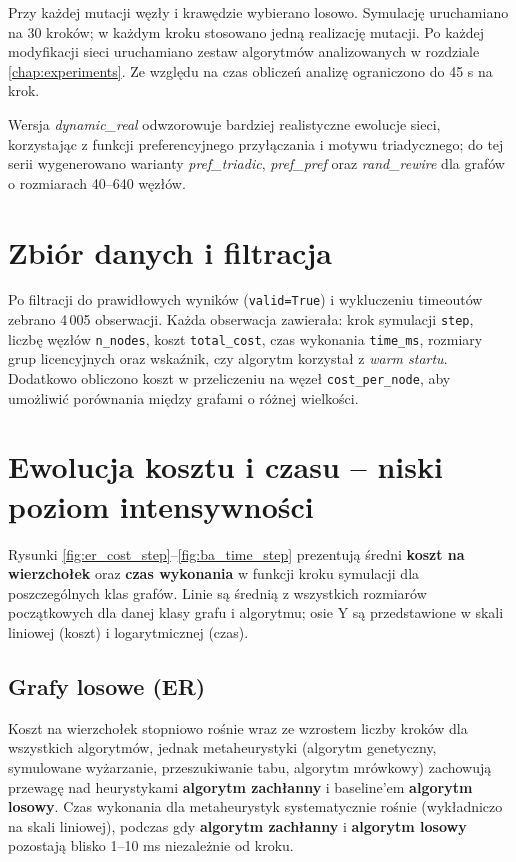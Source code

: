 Przy każdej mutacji węzły i krawędzie wybierano losowo. Symulację uruchamiano na 30 kroków; w każdym kroku stosowano jedną realizację mutacji. Po każdej modyfikacji sieci uruchamiano zestaw algorytmów analizowanych w rozdziale \ref{chap:experiments}. Ze względu na czas obliczeń analizę ograniczono do 45 s na krok.

Wersja \emph{dynamic\_real} odwzorowuje bardziej realistyczne ewolucje sieci, korzystając z funkcji preferencyjnego przyłączania i motywu triadycznego; do tej serii wygenerowano warianty \emph{pref\_triadic}, \emph{pref\_pref} oraz \emph{rand\_rewire} dla grafów o rozmiarach 40--640 węzłów.

\section{Zbiór danych i filtracja}

Po filtracji do prawidłowych wyników (\texttt{valid=True}) i wykluczeniu timeoutów zebrano 4\,005 obserwacji. Każda obserwacja zawierała: krok symulacji \texttt{step}, liczbę węzłów \texttt{n\_nodes}, koszt \texttt{total\_cost}, czas wykonania \texttt{time\_ms}, rozmiary grup licencyjnych oraz wskaźnik, czy algorytm korzystał z \emph{warm startu}. Dodatkowo obliczono koszt w przeliczeniu na węzeł \texttt{cost\_per\_node}, aby umożliwić porównania między grafami o różnej wielkości.

\section{Ewolucja kosztu i czasu -- niski poziom intensywności}

Rysunki \ref{fig:er_cost_step}--\ref{fig:ba_time_step} prezentują średni \textbf{koszt na wierzchołek} oraz \textbf{czas wykonania} w funkcji kroku symulacji dla poszczególnych klas grafów. Linie są średnią z wszystkich rozmiarów początkowych dla danej klasy grafu i algorytmu; osie Y są przedstawione w skali liniowej (koszt) i logarytmicznej (czas).

\subsection{Grafy losowe (ER)}

Koszt na wierzchołek stopniowo rośnie wraz ze wzrostem liczby kroków dla wszystkich algorytmów, jednak metaheurystyki (algorytm genetyczny, symulowane wyżarzanie, przeszukiwanie tabu, algorytm mrówkowy) zachowują przewagę nad heurystykami \textbf{algorytm zachłanny} i baseline'em \textbf{algorytm losowy}. Czas wykonania dla metaheurystyk systematycznie rośnie (wykładniczo na skali liniowej), podczas gdy \textbf{algorytm zachłanny} i \textbf{algorytm losowy} pozostają blisko 1--10 ms niezależnie od kroku.

